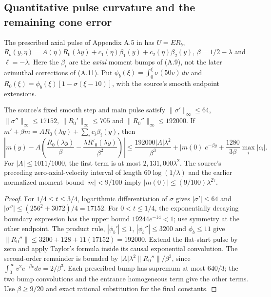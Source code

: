 \subsection*{Quantitative pulse curvature and the remaining cone error}
The prescribed axial pulse of Appendix A.5 in \cite{openai2026} has
$U=ER_b$, $R_b(y,\eta)=A(\eta)R_0(\lambda y)
+c_1(\eta)\beta_1(y)+c_2(\eta)\beta_2(y)$,
$\beta=1/2-\lambda$ and $\ell=-\lambda$. Here the
$\beta_i$ are the \emph{axial} moment bumps of (A.9), not the
later azimuthal corrections of (A.11).
Put $\phi_b(\xi)=\int_0^\xi\sigma(50v)\,dv$ and
$R_0(\xi)=\phi_b(\xi)[1-\sigma(\xi-10)]$, with the
source's smooth endpoint extensions.

\begin{lemma}
\label{lem:A5-source-convolution}
The source's fixed smooth step and main pulse satisfy
$\|\sigma'\|_\infty\le64$,
$\|\sigma''\|_\infty\le17152$,
$\|R_0'\|_\infty\le705$ and
$\|R_0''\|_\infty\le192000$.
If $m'+\beta m=A R_0(\lambda y)+\sum_i c_i\beta_i(y)$, then
\begin{equation}\label{eq:A5-explicit-convolution}
\left|m(y)-A\left(\frac{R_0(\lambda y)}{\beta}
-\frac{\lambda R'_0(\lambda y)}{\beta^2}\right)\right|
\le \frac{192000|A|\lambda^2}{\beta^3}
+|m(0)|e^{-\beta y}+\frac{1280}{3\beta}\max_i|c_i|.
\end{equation}
For $|A|\le1011/1000$, the first term is at most
$2{,}131{,}000\lambda^2$. The source's preceding
zero-axial-velocity interval of length $60\log(1/\lambda)$
and the earlier normalized moment bound $|m|<9/100$ imply
$|m(0)|\le(9/100)\lambda^{27}$.
\end{lemma}
\begin{proof}
For $1/4\le t\le3/4$, logarithmic differentiation of
$\sigma$ gives $|\sigma'|\le64$ and
$|\sigma''|\le(256^2+3072)/4=17152$.
For $0<t\le1/4$, the exponentially decaying boundary
expression has the upper bound
$19244e^{-14}<1$; use symmetry at the other endpoint.
The product rule, $|\phi_b'|\le1$,
$|\phi_b''|\le3200$ and $\phi_b\le11$ give
$\|R_0''\|\le3200+128+11(17152)=192000$.
Extend the flat-start pulse by zero and apply Taylor's
formula inside its causal exponential convolution.
The second-order remainder is bounded by
$|A|\lambda^2\|R_0''\|/\beta^3$, since
$\int_0^\infty v^2e^{-\beta v}dv=2/\beta^3$.
Each prescribed bump has supremum at most $640/3$;
the two bump convolutions and the entrance homogeneous
term give the other terms. Use $\beta\ge9/20$ and
exact rational substitution for the final constants.
\end{proof}

